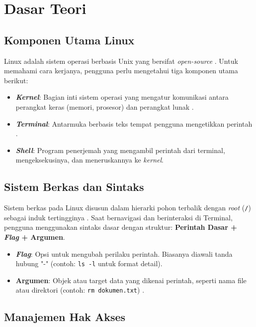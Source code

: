 \newpage
\section{Dasar Teori}

\subsection{Komponen Utama Linux}
Linux adalah sistem operasi berbasis Unix yang bersifat \textit{open-source} \cite{das2012unix}. Untuk memahami cara kerjanya, pengguna perlu mengetahui tiga komponen utama berikut:
\begin{itemize}
    \item \textbf{\textit{Kernel}}: Bagian inti sistem operasi yang mengatur komunikasi antara perangkat keras (memori, prosesor) dan perangkat lunak \cite{Silberschatz2018}.
    \item \textbf{\textit{Terminal}}: Antarmuka berbasis teks tempat pengguna mengetikkan perintah \cite{shotts2019linux}.
    \item \textbf{\textit{Shell}}: Program penerjemah yang mengambil perintah dari terminal, mengeksekusinya, dan meneruskannya ke \textit{kernel}.
\end{itemize}

\subsection{Sistem Berkas dan Sintaks}
Sistem berkas pada Linux disusun dalam hierarki pohon terbalik dengan \textit{root} (\texttt{/}) sebagai induk tertingginya \cite{das2012unix}. Saat bernavigasi dan berinteraksi di Terminal, pengguna menggunakan sintaks dasar dengan struktur: \textbf{Perintah Dasar + \textit{Flag} + Argumen}.

\begin{itemize}
    \item \textbf{\textit{Flag}}: Opsi untuk mengubah perilaku perintah. Biasanya diawali tanda hubung "-" (contoh: \texttt{ls -l} untuk format detail).
    \item \textbf{Argumen}: Objek atau target data yang dikenai perintah, seperti nama file atau direktori (contoh: \texttt{rm dokumen.txt}) \cite{shotts2019linux}.
\end{itemize}

\subsection{Manajemen Hak Akses}

